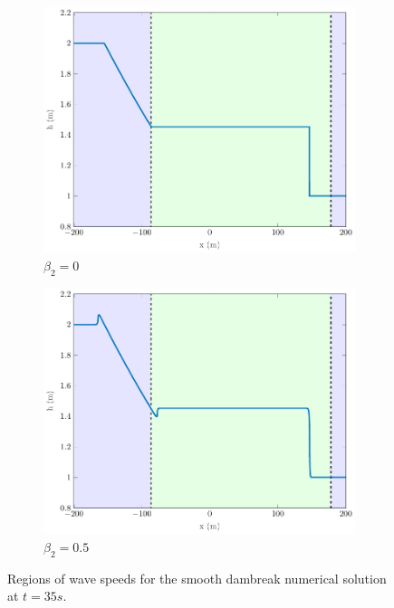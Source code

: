 \documentclass[10pt]{elsarticle}
\begin{document}
\begin{figure}
	\centering
	\begin{subfigure}{0.49\textwidth}
		\centering
		\includegraphics[width=\textwidth]{./Figures/Simulations/Study/RegSWWE/Regions/hRegionsSWWE.pdf}
		\caption{$\beta_2 = 0$}
	\end{subfigure}
	\begin{subfigure}{0.49\textwidth}
		\centering
		\includegraphics[width=\textwidth]{./Figures/Simulations/Study/RegSWWE/Regions/hRegionsREGSWWE.pdf}
		\caption{$\beta_2 = 0.5$}
	\end{subfigure}
	\caption{Regions of wave speeds for the smooth dambreak numerical solution at $t=35s$.}
\end{figure}
\end{document}
